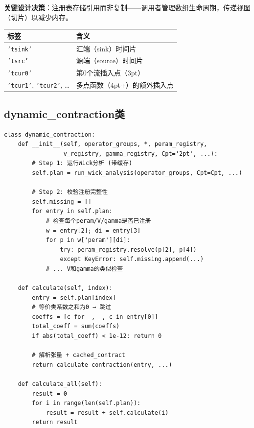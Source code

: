\documentclass[11pt,a4paper]{ctexart}
\begin{document}
\textbf{关键设计决策}：注册表存储引用而非复制——调用者管理数组生命周期，传递视图（切片）以减少内存。

\begin{codebox}[时间标签命名规范]
\begin{center}
\begin{tabular}{ll}
\toprule
标签 & 含义 \\
\midrule
\texttt{'tsink'} & 汇端（sink）时间片 \\
\texttt{'tsrc'} & 源端（source）时间片 \\
\texttt{'tcur0'} & 第0个流插入点（3pt） \\
\texttt{'tcur1'}, \texttt{'tcur2'}, \dots & 多点函数（4pt+）的额外插入点 \\
\bottomrule
\end{tabular}
\end{center}
\end{codebox}

\subsection{dynamic\_contraction类}

\begin{codebox}
\begin{lstlisting}[style=python]
class dynamic_contraction:
    def __init__(self, operator_groups, *, peram_registry,
                 v_registry, gamma_registry, Cpt='2pt', ...):
        # Step 1: 运行Wick分析 (带缓存)
        self.plan = run_wick_analysis(operator_groups, Cpt=Cpt, ...)

        # Step 2: 校验注册完整性
        self.missing = []
        for entry in self.plan:
            # 检查每个peram/V/gamma是否已注册
            w = entry[2]; di = entry[3]
            for p in w['peram'][di]:
                try: peram_registry.resolve(p[2], p[4])
                except KeyError: self.missing.append(...)
            # ... V和gamma的类似检查

    def calculate(self, index):
        entry = self.plan[index]
        # 等价类系数之和为0 → 跳过
        coeffs = [c for _, _, c in entry[0]]
        total_coeff = sum(coeffs)
        if abs(total_coeff) < 1e-12: return 0

        # 解析张量 + cached_contract
        return calculate_contraction(entry, ...)

    def calculate_all(self):
        result = 0
        for i in range(len(self.plan)):
            result = result + self.calculate(i)
        return result
\end{lstlisting}
\end{codebox}
\end{document}
